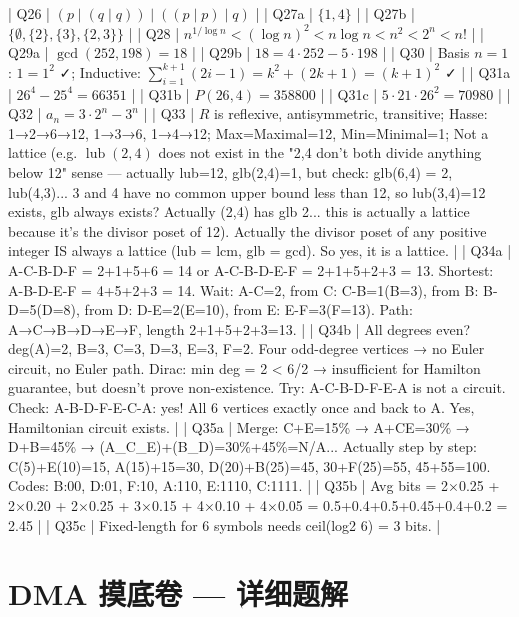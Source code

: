 \documentclass[10pt,a4paper,openany]{ctexbook}
\theoremstyle{definition}
\theoremstyle{remark}
\begin{document}
\vspace{-2pt}

| Q26 | $(p \mid (q \mid q)) \mid ((p \mid p) \mid q)$ |
| Q27a | $\{1, 4\}$ |
| Q27b | $\{\emptyset, \{2\}, \{3\}, \{2, 3\}\}$ |
| Q28 | $n^{1/\log n} < (\log n)^2 < n\log n < n^2 < 2^n < n!$ |
| Q29a | $\gcd(252, 198) = 18$ |
| Q29b | $18 = 4 \cdot 252 - 5 \cdot 198$ |
| Q30 | Basis $n=1$: $1 = 1^2$ ✓; Inductive: $\sum_{i=1}^{k+1}(2i-1) = k^2 + (2k+1) = (k+1)^2$ ✓ |
| Q31a | $26^4 - 25^4 = 66351$ |
| Q31b | $P(26, 4) = 358800$ |
| Q31c | $5 \cdot 21 \cdot 26^2 = 70980$ |
| Q32 | $a_n = 3 \cdot 2^n - 3^n$ |
| Q33 | $R$ is reflexive, antisymmetric, transitive; Hasse: 1→2→6→12, 1→3→6, 1→4→12; Max=Maximal=12, Min=Minimal=1; Not a lattice (e.g. $\operatorname{lub}(2,4)$ does not exist in the "2,4 don't both divide anything below 12" sense — actually lub=12, glb(2,4)=1, but check: glb(6,4) = 2, lub(4,3)... 3 and 4 have no common upper bound less than 12, so lub(3,4)=12 exists, glb always exists? Actually (2,4) has glb 2... this is actually a lattice because it's the divisor poset of 12). Actually the divisor poset of any positive integer IS always a lattice (lub = lcm, glb = gcd). So yes, it is a lattice. |
| Q34a | A-C-B-D-F = 2+1+5+6 = 14 or A-C-B-D-E-F = 2+1+5+2+3 = 13. Shortest: A-B-D-E-F = 4+5+2+3 = 14. Wait: A-C=2, from C: C-B=1(B=3), from B: B-D=5(D=8), from D: D-E=2(E=10), from E: E-F=3(F=13). Path: A→C→B→D→E→F, length 2+1+5+2+3=13. |
| Q34b | All degrees even? deg(A)=2, B=3, C=3, D=3, E=3, F=2. Four odd-degree vertices → no Euler circuit, no Euler path. Dirac: min deg = 2 < 6/2 → insufficient for Hamilton guarantee, but doesn't prove non-existence. Try: A-C-B-D-F-E-A is not a circuit. Check: A-B-D-F-E-C-A: yes! All 6 vertices exactly once and back to A. Yes, Hamiltonian circuit exists. |
| Q35a | Merge: C+E=15\% → A+CE=30\% → D+B=45\% → (A\_C\_E)+(B\_D)=30\%+45\%=N/A... Actually step by step: C(5)+E(10)=15, A(15)+15=30, D(20)+B(25)=45, 30+F(25)=55, 45+55=100. Codes: B:00, D:01, F:10, A:110, E:1110, C:1111. |
| Q35b | Avg bits = 2×0.25 + 2×0.20 + 2×0.25 + 3×0.15 + 4×0.10 + 4×0.05 = 0.5+0.4+0.5+0.45+0.4+0.2 = 2.45 |
| Q35c | Fixed-length for 6 symbols needs ceil(log2 6) = 3 bits. |

\newpage

\section{DMA 摸底卷 — 详细题解}

\vspace{-2pt}
\end{document}
